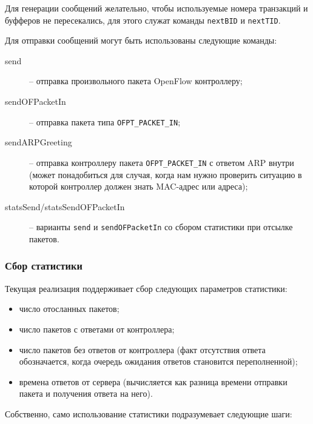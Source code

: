 \documentclass[9pt,a4paper]{article}
\begin{document}
Для генерации сообщений желательно, чтобы используемые номера транзакций и буфферов 
не пересекались, для этого служат команды \lstinline!nextBID! и \lstinline!nextTID!.

Для отправки сообщений могут быть использованы следующие команды:

\begin{description}

  \item[send] -- отправка произвольного пакета OpenFlow контроллеру;

  \item[sendOFPacketIn] -- отправка пакета типа \lstinline!OFPT_PACKET_IN!;

  \item[sendARPGreeting] -- отправка контроллеру пакета \lstinline!OFPT_PACKET_IN!
    с ответом ARP внутри (может понадобиться для случая, когда нам нужно проверить
    ситуацию в которой контроллер должен знать MAC-адрес или адреса);

  \item[statsSend/statsSendOFPacketIn] -- варианты \lstinline!send! и
    \lstinline!sendOFPacketIn! со сбором статистики при отсылке пакетов.

\end{description}

\subsubsection{Сбор статистики}

Текущая реализация поддерживает сбор следующих параметров статистики:

\begin{itemize}
  \item число отосланных пакетов;
  \item число пакетов с ответами от контроллера;
  \item число пакетов без ответов от контроллера (факт отсутствия ответа обозначается,
    когда очередь ожидания ответов становится переполненной);
  \item времена ответов от сервера (вычисляется как разница времени отправки пакета
    и получения ответа на него).
\end{itemize}

Собственно, само использование статистики подразумевает следующие шаги:
\end{document}
